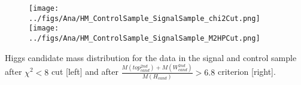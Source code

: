 \begin{frame}{}
\vspace{-.2cm}
\begin{figure}[!Hhtbp]
  \begin{center}
    \texttt{[image: ../figs/Ana/HM\_ControlSample\_SignalSample\_chi2Cut.png]}
    \texttt{[image: ../figs/Ana/HM\_ControlSample\_SignalSample\_M2HPCut.png]}
  \end{center}
\end{figure}

\vspace{-.2cm}
    \begin{block}{}
      \tiny \centering Higgs candidate mass distribution for the data in the signal and control sample after $\chi^{2}<8$ cut [left] and after $\frac{M(top^{2nd}_{cand})+M(W^{2nd}_{cand})}{M(H_{cand})}>6.8$ criterion [right].
    \end{block}

\end{frame}


